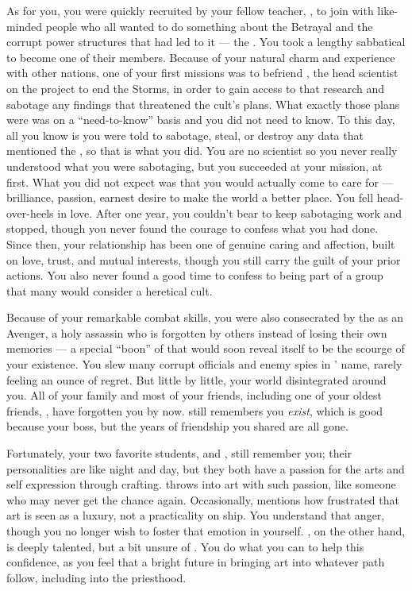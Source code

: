 \documentclass[char]{GL2020}
\begin{document}
As for you, you were quickly recruited by your fellow teacher, \cChupSecond{\full}, to join with like-minded people who all wanted to do something about the Betrayal and the corrupt power structures that had led to it — the \pGoaties{}. You took a lengthy sabbatical to become one of their members. Because of your natural charm and experience with other nations, one of your first missions was to befriend \cHeadScientist{\full}, the head scientist on the project to end the Storms, in order to gain access to that research and sabotage any findings that threatened the cult’s plans. What exactly those plans were was on a “need-to-know” basis and you did not need to know. To this day, all you know is you were told to sabotage, steal, or destroy any data that mentioned the \pSchool{}, so that is what you did. You are no scientist so you never really understood what you were sabotaging, but you succeeded at your mission, at first. What you did not expect was that you would actually come to care for \cHeadScientist{} — \cHeadScientist{\their} brilliance, \cHeadScientist{\their} passion, \cHeadScientist{\their} earnest desire to make the world a better place. You fell head-over-heels in love. After one year, you couldn't bear to keep sabotaging \cHeadScientist{\their} work and stopped, though you never found the courage to confess what you had done. Since then, your relationship has been one of genuine caring and affection, built on love, trust, and mutual interests, though you still carry the guilt of your prior actions. You also never found a good time to confess to being part of a group that many would consider a heretical cult.

Because of your remarkable combat skills, you were also consecrated by the \pGoaties{} as an Avenger, a holy assassin who is forgotten by others instead of losing their own memories — a special ``boon'' of \cGenesis{} that would soon reveal itself to be the scourge of your existence. You slew many corrupt officials and enemy spies in \cGenesis{}’ name, rarely feeling an ounce of regret. But little by little, your world disintegrated around you. All of your family and most of your friends, including one of your oldest friends, \cPrincipal{}, have forgotten you by now. \cPrincipal{} still remembers you \emph{exist}, which is good because \cPrincipal{\theyare} your boss, but the years of friendship you shared are all gone. 

Fortunately, your two favorite students, \cPirateChild{\full} and \cInitiate{\full}, still remember you; their personalities are like night and day, but they both have a passion for the arts and self expression through crafting. \cPirateChild{} throws \cPirateChild{\themself} into art with such passion, like someone who may never get the chance again. Occasionally, \cPirateChild{} mentions how frustrated \cPirateChild{\theyare} that art is seen as a luxury, not a practicality on \cPirateChild{\their} ship. You understand that anger, though you no longer wish to foster that emotion in yourself. \cInitiate{}, on the other hand, is deeply talented, but a bit unsure of \cInitiate{\themself}. You do what you can to help this confidence, as you feel that \cInitiate{\theyhave} a bright future in bringing art into whatever path \cInitiate{\they} follow, including into the priesthood.
\end{document}
